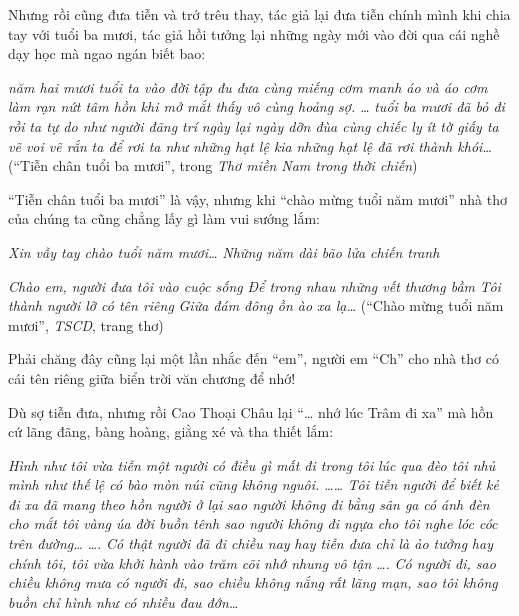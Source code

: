 \documentclass[../main.tex]{subfiles}
\begin{document}
\begin{multicols}{2}
\begin{blockquote}
\end{blockquote}
 
Nhưng rồi cũng đưa tiễn và trớ trêu thay, tác giả lại đưa tiễn chính mình khi chia tay với tuổi ba mươi, tác giả hồi tưởng lại những ngày mới vào đời qua cái nghề dạy học mà ngao ngán biết bao: 
\begin{blockquote}
        
\textit{năm hai mươi tuổi ta vào đời}        
\textit{tập đu đưa cùng miếng cơm manh áo}        
\textit{và áo cơm làm rạn nứt tâm hồn}        
\textit{khi mở mắt thấy vô cùng hoảng sợ.}        
\textit{…}        
\textit{tuổi ba mươi đã bỏ đi rồi}        
\textit{ta tự do như người đãng trí}        
\textit{ngày lại ngày dỡn đùa cùng chiếc ly}        
\textit{ít tờ giấy ta vẽ voi vẽ rắn}        
\textit{ta để rơi ta như những hạt lệ kia}        
\textit{những hạt lệ đã rơi thành khói…}        
(“Tiễn chân tuổi ba mươi”, trong \textit{Thơ miền Nam trong thời chiến}) 

\end{blockquote}
 
“Tiễn chân tuổi ba mươi” là vậy, nhưng khi “chào mừng tuổi năm mươi” nhà thơ của chúng ta cũng chẳng lấy gì làm vui sướng lắm: 
\begin{blockquote}
        
\textit{Xin vẫy tay chào tuổi năm mươi…} 
\textit{Những năm dài bão lửa chiến tranh} 
        
\textit{Chào em, người đưa tôi vào cuộc sống}        
\textit{Để trong nhau những vết thương bầm}        
\textit{Tôi thành người lỡ có tên riêng}        
\textit{Giữa đám đông ồn ào xa lạ…}        
(“Chào mừng tuổi năm mươi”, \textit{TSCD}, trang thơ) 

\end{blockquote}
 
Phải chăng đây cũng lại một lần nhắc đến “em”, người em “Ch” cho nhà thơ có cái tên riêng giữa biển trời văn chương để nhớ!  
 
Dù sợ tiễn đưa, nhưng rồi Cao Thoại Châu lại “… nhớ lúc Trâm đi xa” mà hồn cứ lãng đãng, bàng hoàng, giằng xé và tha thiết lắm: 
\begin{blockquote}
        
\textit{Hình như tôi vừa tiễn một người}        
\textit{có điều gì mất đi trong tôi}        
\textit{lúc qua đèo tôi nhủ mình như thế}        
\textit{lệ có bào mòn núi cũng không nguôi.}        
\textit{……}        
\textit{Tôi tiễn người để biết kẻ đi xa}        
\textit{đã mang theo hồn người ở lại}        
\textit{sao người không đi bằng sân ga}        
\textit{có ánh đèn cho mắt tôi vàng úa}        
\textit{đời buồn tênh sao người không đi ngựa}        
\textit{cho tôi nghe lóc cóc trên đường…}        
\textit{….}        
\textit{Có thật người đã đi chiều nay}        
\textit{hay tiễn đưa chỉ là ảo tưởng}        
\textit{hay chính tôi, tôi vừa khởi hành}        
\textit{vào trăm cõi nhớ nhung vô tận}        
\textit{….}        
\textit{Có người đi, sao chiều không mưa}        
\textit{có người đi, sao chiều không nắng}        
\textit{rất lãng mạn, sao tôi không buồn} 
\textit{chỉ hình như có nhiều đau đớn…} 


\end{blockquote}
\end{multicols}
\end{document}
